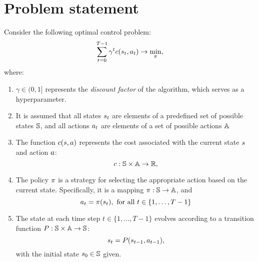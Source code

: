 \documentclass[12pt,twoside]{../../mitthesis}
\begin{document}
\section*{Problem statement}
Consider the following optimal control problem:
\begin{equation}
    \label{eqn_ddpg_problem}
    \sum_{t = 0}^{T-1} \gamma ^ t c(s_{t}, a_{t}) \rightarrow \min_{\pi},
\end{equation}
where:
\begin{enumerate}
    \item $\gamma \in (0, 1]$  represents the \textit{discount factor} of the algorithm, which serves as a hyperparameter.
    \item It is assumed that all states $s_t$ are elements of a predefined set of possible states $\mathbb S$, and all actions $a_t$ are elements of a set of possible actions $\mathbb A$
    \item The function $c(s, a)$ represents the cost associated with the current state $s$ and action $a$:
    $$
        c : \mathbb S \times \mathbb A \to {\mathbb{R}},
    $$
    \item  The policy $\pi$ is a strategy for selecting the appropriate action based on the current state. Specifically, it is a mapping $\pi: \mathbb S \rightarrow \mathbb A$, and
    $$
        a_{t} = \pi(s_{t}), \text{ for all } t \in \{1, \ldots, T-1\}
    $$
    \item The state at each time step $t \in \{1, ..., T-1\}$ evolves according to a transition function $P: \mathbb S \times \mathbb A \to \mathbb S$:
    $$
        s_{t} = P(s_{t-1}, a_{t-1}),
    $$ 
    with the initial state $s_0 \in \mathbb S$ given.
    
\end{enumerate}
\end{document}
